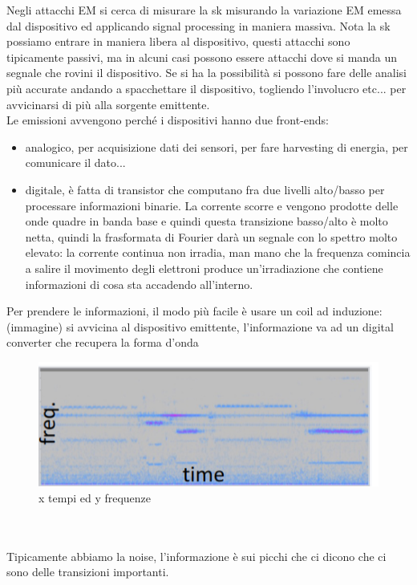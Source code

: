 \documentclass[oneside, 12pt]{extbook}
\begin{document}
Negli attacchi EM si cerca di misurare la sk misurando la variazione EM emessa dal dispositivo ed applicando signal processing in maniera massiva. Nota la sk possiamo entrare in maniera libera al dispositivo, questi attacchi sono tipicamente passivi, ma in alcuni casi possono essere attacchi dove si manda un segnale che rovini il dispositivo. Se si ha la possibilità si possono fare delle analisi più accurate andando a spacchettare il dispositivo, togliendo l'involucro etc... per avvicinarsi di più alla sorgente emittente.\\Le emissioni avvengono perché i dispositivi hanno due front-ends:
\begin{itemize}
	\item analogico, per acquisizione dati dei sensori, per fare harvesting di energia, per comunicare il dato...
	\item digitale, è fatta di transistor che computano fra due livelli alto/basso per processare informazioni binarie. La corrente scorre e vengono prodotte delle onde quadre in banda base e quindi questa transizione basso/alto è molto netta, quindi la frasformata di Fourier darà un segnale con lo spettro molto elevato: la corrente continua non irradia, man mano che la frequenza comincia a salire il movimento degli elettroni produce un'irradiazione che contiene informazioni di cosa sta accadendo all'interno.
\end{itemize}
Per prendere le informazioni, il modo più facile è usare un coil ad induzione: (immagine) si avvicina al dispositivo emittente, l'informazione va ad un digital converter che recupera la forma d'onda \\
\begin{figure}[!h]
	\includegraphics[scale=0.3]{immagini/time-freq-rsa.png}
	\caption{x tempi ed y frequenze}
\end{figure}\\\\
Tipicamente abbiamo la noise, l'informazione è sui picchi che ci dicono che ci sono delle transizioni importanti.
\end{document}
